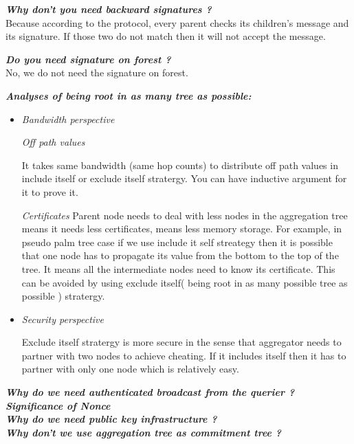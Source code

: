 \textbf{\textit{Why don't you need backward signatures ?}}\\ Because according to the protocol, every parent checks its children's message and its signature. If those two do not match then it will not accept the message.

\textbf{\textit{Do you need signature on forest ?}}\\No, we do not need the signature on forest.

\textbf{\textit{Analyses of being root in as many tree as possible:}}
	
	\begin{itemize}
		\item \textit{Bandwidth perspective}
	
			\textit{Off path values}
				
				It takes same bandwidth (same hop counts) to distribute off path values in include itself or exclude itself stratergy. You can have inductive argument for it to prove it.

			\textit{Certificates}
				Parent node needs to deal with less nodes in the aggregation tree means it needs less certificates, means less memory storage. For example, in pseudo palm tree case if we use include it self streategy then it is possible that one node has to propagate its value from the bottom to the top of the tree. It means all the intermediate nodes need to know its certificate. This can be avoided by using exclude itself( being root in as many possible tree as possible ) stratergy.

		\item \textit{Security perspective}

				Exclude itself stratergy is more secure in the sense that aggregator needs to partner with two nodes to achieve cheating. If it includes itself then it has to partner with only one node which is relatively easy.

	\end{itemize}

\textbf{\textit{Why do we need authenticated broadcast from the querier ?}}\\

\textbf{\textit{Significance of Nonce}}\\

\textbf{\textit{Why do we need public key infrastructure ?}}\\

\textbf{\textit{Why don't we use aggregation tree as commitment tree ?}}\\

